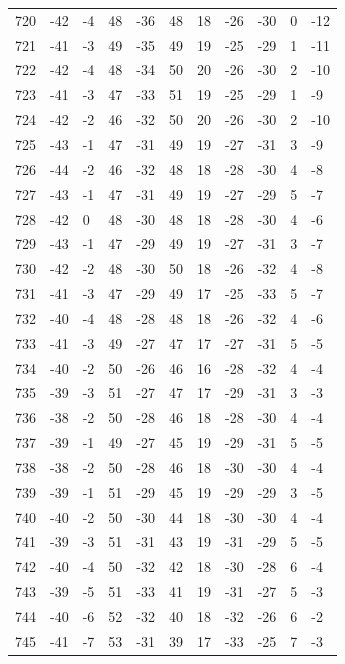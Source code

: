 \begin{table}[H]
\begin{tabular}{lllllllllll}
720 & -42 & -4 & 48 & -36 & 48 & 18 & -26 & -30 & 0 & -12 \\
721 & -41 & -3 & 49 & -35 & 49 & 19 & -25 & -29 & 1 & -11 \\
722 & -42 & -4 & 48 & -34 & 50 & 20 & -26 & -30 & 2 & -10 \\
723 & -41 & -3 & 47 & -33 & 51 & 19 & -25 & -29 & 1 & -9 \\
724 & -42 & -2 & 46 & -32 & 50 & 20 & -26 & -30 & 2 & -10 \\
725 & -43 & -1 & 47 & -31 & 49 & 19 & -27 & -31 & 3 & -9 \\
726 & -44 & -2 & 46 & -32 & 48 & 18 & -28 & -30 & 4 & -8 \\
727 & -43 & -1 & 47 & -31 & 49 & 19 & -27 & -29 & 5 & -7 \\
728 & -42 & 0 & 48 & -30 & 48 & 18 & -28 & -30 & 4 & -6 \\
729 & -43 & -1 & 47 & -29 & 49 & 19 & -27 & -31 & 3 & -7 \\
730 & -42 & -2 & 48 & -30 & 50 & 18 & -26 & -32 & 4 & -8 \\
731 & -41 & -3 & 47 & -29 & 49 & 17 & -25 & -33 & 5 & -7 \\
732 & -40 & -4 & 48 & -28 & 48 & 18 & -26 & -32 & 4 & -6 \\
733 & -41 & -3 & 49 & -27 & 47 & 17 & -27 & -31 & 5 & -5 \\
734 & -40 & -2 & 50 & -26 & 46 & 16 & -28 & -32 & 4 & -4 \\
735 & -39 & -3 & 51 & -27 & 47 & 17 & -29 & -31 & 3 & -3 \\
736 & -38 & -2 & 50 & -28 & 46 & 18 & -28 & -30 & 4 & -4 \\
737 & -39 & -1 & 49 & -27 & 45 & 19 & -29 & -31 & 5 & -5 \\
738 & -38 & -2 & 50 & -28 & 46 & 18 & -30 & -30 & 4 & -4 \\
739 & -39 & -1 & 51 & -29 & 45 & 19 & -29 & -29 & 3 & -5 \\
740 & -40 & -2 & 50 & -30 & 44 & 18 & -30 & -30 & 4 & -4 \\
741 & -39 & -3 & 51 & -31 & 43 & 19 & -31 & -29 & 5 & -5 \\
742 & -40 & -4 & 50 & -32 & 42 & 18 & -30 & -28 & 6 & -4 \\
743 & -39 & -5 & 51 & -33 & 41 & 19 & -31 & -27 & 5 & -3 \\
744 & -40 & -6 & 52 & -32 & 40 & 18 & -32 & -26 & 6 & -2 \\
745 & -41 & -7 & 53 & -31 & 39 & 17 & -33 & -25 & 7 & -3 \\

\end{tabular}
\end{table}
